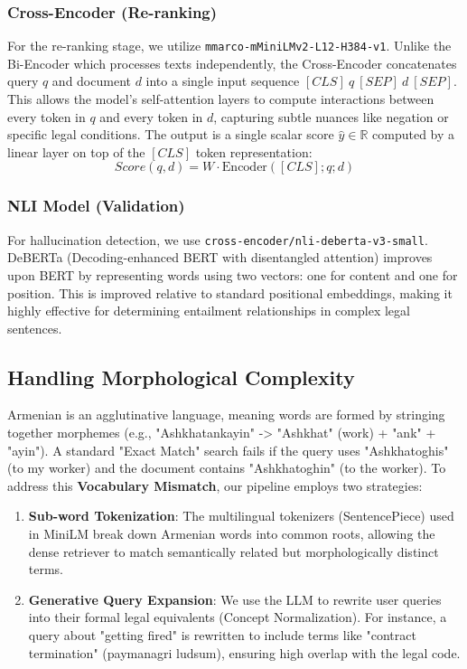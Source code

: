 \documentclass[11pt]{article}
\begin{document}
\subsubsection{Cross-Encoder (Re-ranking)}
For the re-ranking stage, we utilize \texttt{mmarco-mMiniLMv2-L12-H384-v1}. Unlike the Bi-Encoder which processes texts independently, the Cross-Encoder concatenates query $q$ and document $d$ into a single input sequence $[CLS] \ q \ [SEP] \ d \ [SEP]$. This allows the model's self-attention layers to compute interactions between every token in $q$ and every token in $d$, capturing subtle nuances like negation or specific legal conditions.
The output is a single scalar score $\hat{y} \in \mathbb{R}$ computed by a linear layer on top of the $[CLS]$ token representation:
\begin{equation}
    Score(q, d) = W \cdot \text{Encoder}([CLS]; q; d)
\end{equation}

\subsubsection{NLI Model (Validation)}
For hallucination detection, we use \texttt{cross-encoder/nli-deberta-v3-small}. DeBERTa (Decoding-enhanced BERT with disentangled attention) improves upon BERT by representing words using two vectors: one for content and one for position. This is improved relative to standard positional embeddings, making it highly effective for determining entailment relationships in complex legal sentences.

\subsection{Handling Morphological Complexity}
Armenian is an agglutinative language, meaning words are formed by stringing together morphemes (e.g., "Ashkhatankayin" -> "Ashkhat" (work) + "ank" + "ayin"). A standard "Exact Match" search fails if the query uses "Ashkhatoghis" (to my worker) and the document contains "Ashkhatoghin" (to the worker).
To address this \textbf{Vocabulary Mismatch}, our pipeline employs two strategies:
\begin{enumerate}
    \item \textbf{Sub-word Tokenization}: The multilingual tokenizers (SentencePiece) used in MiniLM break down Armenian words into common roots, allowing the dense retriever to match semantically related but morphologically distinct terms.
    \item \textbf{Generative Query Expansion}: We use the LLM to rewrite user queries into their formal legal equivalents (Concept Normalization). For instance, a query about "getting fired" is rewritten to include terms like "contract termination" (paymanagri ludsum), ensuring high overlap with the legal code.
\end{enumerate}
\end{document}
